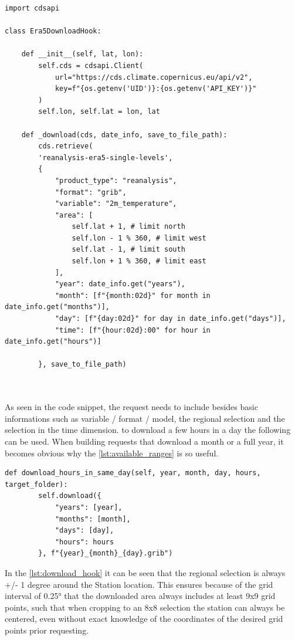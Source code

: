 \begin{lstlisting}[caption=Download Hook for ERA5 Data, label=lst:download_hook]
import cdsapi

class Era5DownloadHook:
    
    def __init__(self, lat, lon):
        self.cds = cdsapi.Client(
            url="https://cds.climate.copernicus.eu/api/v2",
            key=f"{os.getenv('UID')}:{os.getenv('API_KEY')}"
        )
        self.lon, self.lat = lon, lat

    def _download(cds, date_info, save_to_file_path):
        cds.retrieve(
        'reanalysis-era5-single-levels',
        {
            "product_type": "reanalysis",
            "format": "grib",
            "variable": "2m_temperature",
            "area": [
                self.lat + 1, # limit north
                self.lon - 1 % 360, # limit west
                self.lat - 1, # limit south
                self.lon + 1 % 360, # limit east
            ],
            "year": date_info.get("years"),
            "month": [f"{month:02d}" for month in date_info.get("months")],
            "day": [f"{day:02d}" for day in date_info.get("days")],
            "time": [f"{hour:02d}:00" for hour in date_info.get("hours")]

        }, save_to_file_path)



\end{lstlisting}

As seen in the code snippet, the request needs to include besides basic informations such as variable / format / model, the regional selection and the selection in the time dimension.
to download a few hours in a day the following can be used. When building requests that download a month or a full year, it becomes obvious why the \autoref{lst:available_ranges} is so useful.

\begin{lstlisting}[caption=Download Hours in Same Day in Download Hook Class, label=lst:download_hours_in_same_day]
    def download_hours_in_same_day(self, year, month, day, hours, target_folder):
        self.download({
            "years": [year],
            "months": [month],
            "days": [day],
            "hours": hours
        }, f"{year}_{month}_{day}.grib")
\end{lstlisting}

In the \autoref{lst:download_hook} it can be seen that the regional selection is always +/- 1 degree around the Station location. This ensures because of the grid interval of 0.25° that the downloaded area always includes at least 9x9 grid points, such that when cropping to an 8x8 selection the station can always be centered, even without exact knowledge of the coordinates of the desired grid points prior requesting. 


